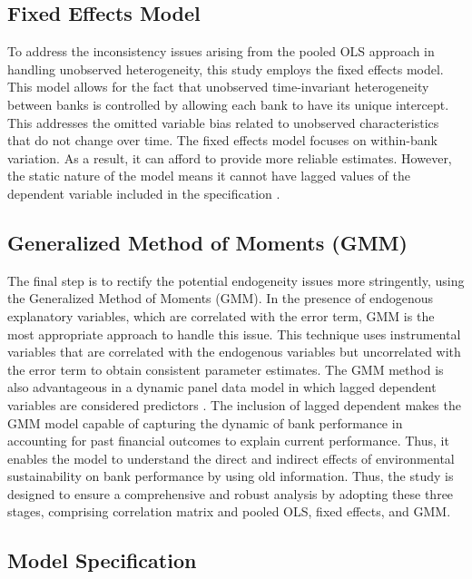 \documentclass[11pt, a4paper]{article}
\begin{document}
\subsection{Fixed Effects Model}
To address the inconsistency issues arising from the pooled OLS approach in handling unobserved heterogeneity, this study employs the fixed effects model. This model allows for the fact that unobserved time-invariant heterogeneity between banks is controlled by allowing each bank to have its unique intercept. This addresses the omitted variable bias related to unobserved characteristics that do not change over time. The fixed effects model focuses on within-bank variation. As a result, it can afford to provide more reliable estimates. However, the static nature of the model means it cannot have lagged values of the dependent variable included in the specification \citep{Wooldridge2010}.

\subsection{Generalized Method of Moments (GMM)}
The final step is to rectify the potential endogeneity issues more stringently, using the Generalized Method of Moments (GMM). In the presence of endogenous explanatory variables, which are correlated with the error term, GMM is the most appropriate approach to handle this issue. This technique uses instrumental variables that are correlated with the endogenous variables but uncorrelated with the error term to obtain consistent parameter estimates. The GMM method is also advantageous in a dynamic panel data model in which lagged dependent variables are considered predictors \citep{Baum2003}. The inclusion of lagged dependent makes the GMM model capable of capturing the dynamic of bank performance in accounting for past financial outcomes to explain current performance. Thus, it enables the model to understand the direct and indirect effects of environmental sustainability on bank performance by using old information. Thus, the study is designed to ensure a comprehensive and robust analysis by adopting these three stages, comprising correlation matrix and pooled OLS, fixed effects, and GMM.

\subsection{Model Specification}
\end{document}
